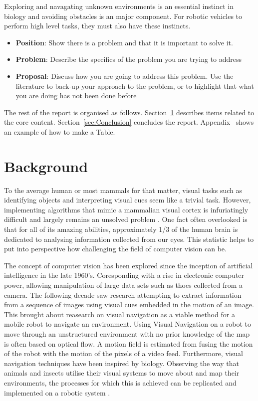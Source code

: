 \documentclass{UoNMCHA}
\numberwithin{equation}{section}
\begin{document}
Exploring and navagating unknown environments is an essential instinct in biology and avoiding obstacles is an major component. For robotic vehicles to perform high level tasks, they must also have these instincts.

\begin{itemize}
    \item \textbf{Position}: Show there is a problem and that it is important to solve it.
    \item \textbf{Problem}: Describe the specifics of the problem you are trying to address
    \item \textbf{Proposal}: Discuss how you are going to address this problem. Use the literature to back-up your approach to the problem, or to highlight that what you are doing has not been done before
\end{itemize}

The rest of the report is organised as follows. Section~\ref{sec:Background} describes items related to the core content. Section~\ref{sec:Conclusion} concludes the report. Appendix~ shows an example of how to make a Table.

\newpage
\section{Background}\label{sec:Background}
To the average human or most mammals for that matter, visual tasks such as identifying objects and interpreting visual cues seem like a trivial task. However, implementing algorithms that mimic a mammalian visual cortex is infuriatingly difficult and largely remains an unsolved problem \citep{hartley2003multiple}. One fact often overlooked is that for all of its amazing abilities, approximately 1/3 of the human brain is dedicated to analysing information collected from our eyes. This statistic helps to put into perspective how challenging the field of computer vision can be.

The concept of computer vision has been explored since the inception of artificial intelligence in the late 1960’s. Coresponding with a rise in electronic computer power, allowing manipulation of large data sets such as thoes collected from a camera. The following decade saw research attempting to extract information from a sequence of images using visual cues embedded in the motion of an image. This brought about reasearch on visual navigation as a viable method for a mobile robot to navigate an environment. Using Visual Navigation on a robot to move through an unstructured environment with no prior knowledge of the map is often based on optical flow. A motion field is estimated from fusing the motion of the robot with the motion of the pixels of a video feed. Furthermore, visual navigation techniques have been inspired by biology. Observing the way that animals and insects utilise their visual systems to move about and map their environments, the processes for which this is achieved can be replicated and implemented on a robotic system \citep{altshuler2018comparison}.
\end{document}
